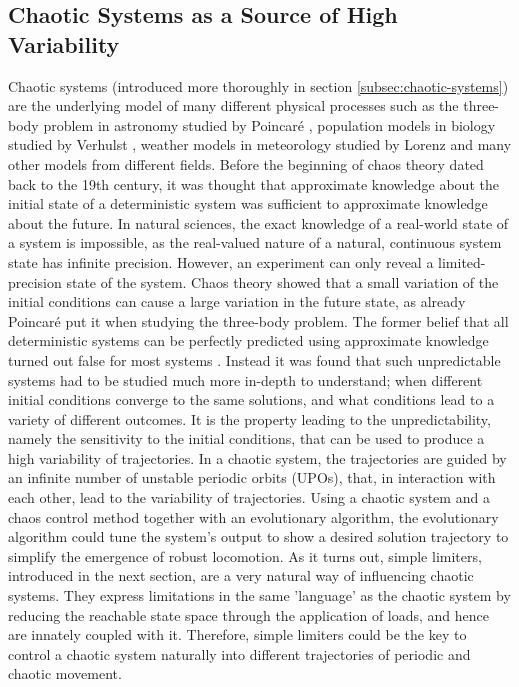 \documentclass[main]{subfiles}
\begin{document}
\subsection{Chaotic Systems as a Source of High Variability}

Chaotic systems (introduced more thoroughly in section \ref{subsec:chaotic-systems}) are the underlying model of many different physical processes such as the three-body problem in astronomy studied by Poincaré \cite{bib:Poincare1892}, population models in biology studied by Verhulst \cite{bib:Verhulst1838}, weather models in meteorology studied by Lorenz \cite{bib:Lorenz1963} and many other models from different fields. %
%
Before the beginning of chaos theory dated back to the 19th century, it was thought that approximate knowledge about the initial state of a deterministic system was sufficient to approximate knowledge about the future. %
%
In natural sciences, the exact knowledge of a real-world state of a system is impossible, as the real-valued nature of a natural, continuous system state has infinite precision. %
%
However, an experiment can only reveal a limited-precision state of the system. %
%
Chaos theory showed that a small variation of the initial conditions can cause a large variation in the future state, as already Poincaré put it when studying the three-body problem. %
%
The former belief that all deterministic systems can be perfectly predicted using approximate knowledge turned out false for most systems \cite{bib:Motter2013}. %
%
Instead it was found that such unpredictable systems had to be studied much more in-depth to understand; when different initial conditions converge to the same solutions, and what conditions lead to a variety of different outcomes. %
%
It is the property leading to the unpredictability, namely the sensitivity to the initial conditions, that can be used to produce a high variability of trajectories. %
%
In a chaotic system, the trajectories are guided by an infinite number of unstable periodic orbits (UPOs), that, in interaction with each other, lead to the variability of trajectories. %
%
Using a chaotic system and a chaos control method together with an evolutionary algorithm, the evolutionary algorithm could tune the system's output to show a desired solution trajectory to simplify the emergence of robust locomotion. %
%
As it turns out, simple limiters, introduced in the next section, are a very natural way of influencing chaotic systems. %
%
They express limitations in the same 'language' as the chaotic system by reducing the reachable state space through the application of loads, and hence are innately coupled with it. %
%
Therefore, simple limiters could be the key to control a chaotic system naturally into different trajectories of periodic and chaotic movement. %
\end{document}
